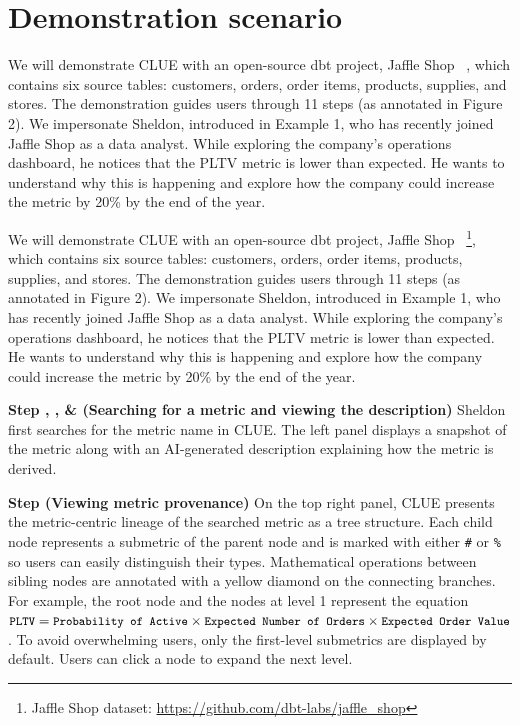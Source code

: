 \section{Demonstration scenario}

We will demonstrate CLUE with an open-source dbt project, Jaffle Shop
~\cite{jaffleShop}, which contains six source tables: customers, orders, order
items, products, supplies, and stores. The demonstration guides users through 11
steps (as annotated in Figure 2). We impersonate Sheldon, introduced in Example
1, who has recently joined Jaffle Shop as a data analyst. While exploring the
company's operations dashboard, he notices that the PLTV metric is lower than
expected. He wants to understand why this is happening and explore how the
company could increase the metric by 20\% by the end of the year.

We will demonstrate CLUE with an open-source dbt project, Jaffle Shop
~\footnote{Jaffle Shop dataset: \url{https://github.com/dbt-labs/jaffle_shop}},
which contains six source tables: customers, orders, order items, products,
supplies, and stores. The demonstration guides users through 11 steps (as
annotated in Figure 2). We impersonate Sheldon, introduced in Example 1, who has
recently joined Jaffle Shop as a data analyst. While exploring the company's
operations dashboard, he notices that the PLTV metric is lower than expected. He
wants to understand why this is happening and explore how the company could
increase the metric by 20\% by the end of the year.

\textbf{Step , , \&  (Searching for
a metric and viewing the description)} Sheldon first searches for the metric
name in CLUE. The left panel displays a snapshot of the metric along with an
AI-generated description explaining how the metric is derived.

\textbf{Step  (Viewing metric provenance)} On the top right
panel, CLUE presents the metric-centric lineage of the searched metric as a tree
structure. Each child node represents a submetric of the parent node and is
marked with either \texttt{\#} or \texttt{\%} so users can easily distinguish
their types. Mathematical operations between sibling nodes are annotated with a
yellow diamond on the connecting branches. For example, the root node and the
nodes at level 1 represent the equation ${\small\texttt{{\small PLTV}}} = {\small\texttt{{\small Probability of
Active}}} \times {\small\texttt{{\small Expected Number of Orders}}} \times {\small\texttt{{\small Expected Order
Value}}}$. To avoid overwhelming users, only the first-level submetrics are
displayed by default. Users can click a node to expand the next level.


